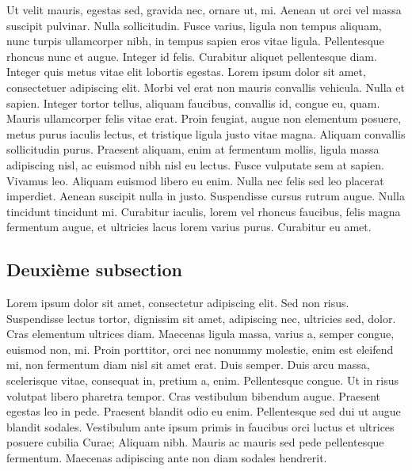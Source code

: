 \documentclass{rgtmg} %
\begin{document}
Ut velit mauris, egestas sed, gravida nec, ornare ut, mi. Aenean ut orci vel massa suscipit pulvinar. Nulla sollicitudin. Fusce varius, ligula non tempus aliquam, nunc turpis ullamcorper nibh, in tempus sapien eros vitae ligula. Pellentesque rhoncus nunc et augue. Integer id felis. Curabitur aliquet pellentesque diam. Integer quis metus vitae elit lobortis egestas. Lorem ipsum dolor sit amet, consectetuer adipiscing elit. Morbi vel erat non mauris convallis vehicula. Nulla et sapien. Integer tortor tellus, aliquam faucibus, convallis id, congue eu, quam. Mauris ullamcorper felis vitae erat. Proin feugiat, augue non elementum posuere, metus purus iaculis lectus, et tristique ligula justo vitae magna.
Aliquam convallis sollicitudin purus. Praesent aliquam, enim at fermentum mollis, ligula massa adipiscing nisl, ac euismod nibh nisl eu lectus. Fusce vulputate sem at sapien. Vivamus leo. Aliquam euismod libero eu enim. Nulla nec felis sed leo placerat imperdiet. Aenean suscipit nulla in justo. Suspendisse cursus rutrum augue. Nulla tincidunt tincidunt mi. Curabitur iaculis, lorem vel rhoncus faucibus, felis magna fermentum augue, et ultricies lacus lorem varius purus. Curabitur eu amet.

\subsection{Deuxième subsection}

Lorem ipsum dolor sit amet, consectetur adipiscing elit. Sed non risus. Suspendisse lectus tortor, dignissim sit amet, adipiscing nec, ultricies sed, dolor. Cras elementum ultrices diam. Maecenas ligula massa, varius a, semper congue, euismod non, mi. Proin porttitor, orci nec nonummy molestie, enim est eleifend mi, non fermentum diam nisl sit amet erat. Duis semper. Duis arcu massa, scelerisque vitae, consequat in, pretium a, enim. Pellentesque congue. Ut in risus volutpat libero pharetra tempor. Cras vestibulum bibendum augue. Praesent egestas leo in pede. Praesent blandit odio eu enim. Pellentesque sed dui ut augue blandit sodales. Vestibulum ante ipsum primis in faucibus orci luctus et ultrices posuere cubilia Curae; Aliquam nibh. Mauris ac mauris sed pede pellentesque fermentum. Maecenas adipiscing ante non diam sodales hendrerit.
\end{document}
